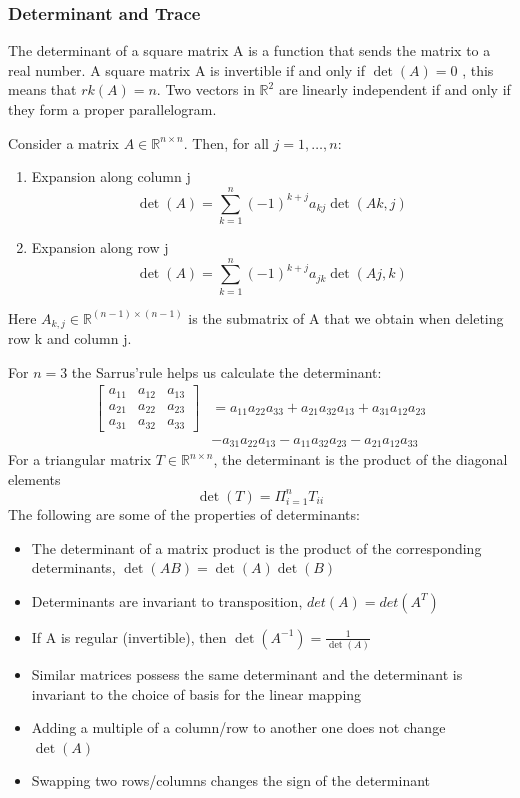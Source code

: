 \subsubsection{Determinant and Trace}
The determinant of a square matrix A is a function that sends the matrix to a real number. A square matrix A is invertible if and only if $\det(A)= 0$ , this means that $rk(A)=n$. Two vectors in $\mathbb{R}^2$ are linearly independent if and only if they form a proper parallelogram.
\begin{theorem}
    Consider a matrix $A \in \mathbb{R}^{n\times n}$. Then, for all $j = 1, \ldots,n$:
    \begin{enumerate}
        \item Expansion along column j
        \[  
            \det(A) = \sum_{k=1}^{n}{(-1)^{k+j}a_{kj}\det(A{k,j})}  
        \]
        \item Expansion along row j
        \[  
            \det(A) = \sum_{k=1}^{n}{(-1)^{k+j}a_{jk}\det(A{j,k})}  
        \]
    \end{enumerate}
    Here $A_{k,j} \in \mathbb{R}^{(n-1)\times (n-1)}$ is the submatrix of A that we obtain when deleting row k and column j.
\end{theorem}
For $n=3$ the Sarrus'rule helps us calculate the determinant:
\begin{align*}
    \begin{bmatrix}
        a_{11} & a_{12} &a_{13}\\
        a_{21} & a_{22} &a_{23}\\
        a_{31} & a_{32} &a_{33}
    \end{bmatrix} &= a_{11}a_{22}a_{33}+a_{21}a_{32}a_{13}+a_{31}a_{12}a_{23}\\
    &-a_{31}a_{22}a_{13}-a_{11}a_{32}a_{23}-a_{21}a_{12}a_{33}
\end{align*}
For a triangular matrix $T \in \mathbb{R}^{n\times n}$, the determinant is the product of the diagonal elements
\[ 
    \det(T) = \Pi_{i=1}^{n}{T_{ii}} 
\]
The following are some of the properties of determinants:
\begin{itemize}
    \item The determinant of a matrix product is the product of the corresponding determinants, $\det(AB) = \det(A)\det(B)$
    \item Determinants are invariant to transposition, $det(A) = det(A^T)$
    \item If A is regular (invertible), then $\det(A^{-1})= \frac{1}{\det(A)}$
    \item Similar matrices possess the same determinant and the determinant is invariant to the choice of basis for the linear mapping
    \item Adding a multiple of a column/row to another one does not change $\det(A)$
    \item Swapping two rows/columns changes the sign of the determinant
\end{itemize}
